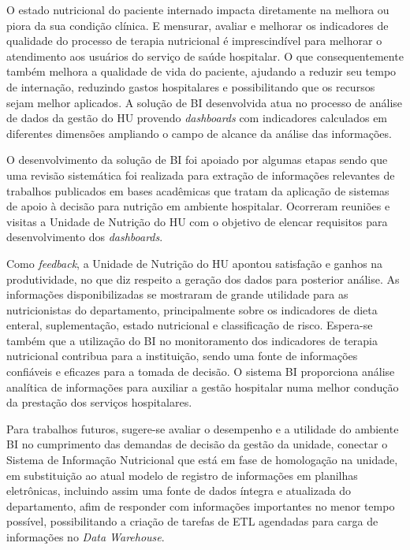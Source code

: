 O estado nutricional do paciente internado impacta diretamente na melhora ou piora da sua condição clínica. E mensurar, avaliar e melhorar os indicadores de qualidade do processo de terapia nutricional é imprescindível para melhorar o atendimento aos usuários do serviço de saúde hospitalar. O que consequentemente também melhora a qualidade de vida do paciente, ajudando a reduzir seu tempo de internação, reduzindo gastos hospitalares e possibilitando que os recursos sejam melhor aplicados. A solução de BI desenvolvida atua no processo de análise de dados da gestão do HU provendo \textit{dashboards} com indicadores calculados em diferentes dimensões ampliando o campo de alcance da análise das informações.

O desenvolvimento da solução de BI foi apoiado por algumas etapas sendo que uma revisão sistemática foi realizada para extração de informações relevantes de trabalhos publicados em bases acadêmicas que tratam da aplicação de sistemas de apoio à decisão para nutrição em ambiente hospitalar. Ocorreram reuniões e visitas a Unidade de Nutrição do HU com o objetivo de elencar requisitos para desenvolvimento dos \textit{dashboards}.

Como \textit{feedback}, a Unidade de Nutrição do HU apontou satisfação e ganhos na produtividade, no que diz respeito a geração dos dados para posterior análise. As informações disponibilizadas se mostraram de grande utilidade para as nutricionistas do departamento, principalmente sobre os indicadores de dieta enteral, suplementação, estado nutricional e classificação de risco. Espera-se também que a utilização do BI no monitoramento dos indicadores de terapia nutricional contribua para a instituição, sendo uma fonte de informações confiáveis e eficazes para a tomada de decisão. O sistema BI proporciona análise analítica de informações para auxiliar a gestão hospitalar numa melhor condução da prestação dos serviços hospitalares.

Para trabalhos futuros, sugere-se avaliar o desempenho e a utilidade do ambiente BI no cumprimento das demandas de decisão da gestão da unidade, conectar o Sistema de Informação Nutricional que está em fase de homologação na unidade, em substituição ao atual modelo de registro de informações em planilhas eletrônicas, incluindo assim uma fonte de dados íntegra e atualizada do departamento, afim de responder com informações importantes no menor tempo possível, possibilitando a criação de tarefas de ETL agendadas para carga de informações no \textit{Data Warehouse}.